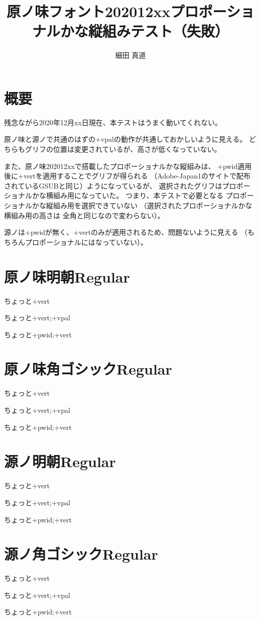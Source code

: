 \documentclass[tate]{jlreq}
\title{原ノ味フォント202012xxプロポーショナルかな縦組みテスト（失敗）}
\author{細田 真道}
\begin{document}
\maketitle

\section*{概要}

残念ながら2020年12月xx日現在、本テストはうまく動いてくれない。

原ノ味と源ノで共通のはずの+vpalの動作が共通しておかしいように見える。
どちらもグリフの位置は変更されているが、高さが低くなっていない。

また、原ノ味202012xxで搭載したプロポーショナルかな縦組みは、
+pwid適用後に+vertを適用することでグリフが得られる
（Adobe-Japan1のサイトで配布されているGSUBと同じ）ようになっているが、
選択されたグリフはプロポーショナルかな横組み用になっていた。
つまり、本テストで必要となる
プロポーショナルかな縦組み用を選択できていない
（選択されたプロポーショナルかな横組み用の高さは
  全角と同じなので変わらない）。

源ノは+pwidが無く、+vertのみが適用されるため、問題ないように見える
（もちろんプロポーショナルにはなっていない）。

\clearpage

\section*{原ノ味明朝Regular}

\hmrnone\hbox{\tate\vrule ちょっと\vrule +vert}

\hmrvpal\hbox{\tate\vrule ちょっと\vrule +vert;+vpal}

\hmrpwidvert\hbox{\tate\vrule ちょっと\vrule +pwid;+vert}

\section*{原ノ味角ゴシックRegular}

\hgrnone\hbox{\tate\vrule ちょっと\vrule +vert}

\hgrvpal\hbox{\tate\vrule ちょっと\vrule +vert;+vpal}

\hgrpwidvert\hbox{\tate\vrule ちょっと\vrule +pwid;+vert}

\section*{源ノ明朝Regular}

\sernone\hbox{\tate\vrule ちょっと\vrule +vert}

\servpal\hbox{\tate\vrule ちょっと\vrule +vert;+vpal}

\serpwidvert\hbox{\tate\vrule ちょっと\vrule +pwid;+vert}

\section*{源ノ角ゴシックRegular}

\sarnone\hbox{\tate\vrule ちょっと\vrule +vert}

\sarvpal\hbox{\tate\vrule ちょっと\vrule +vert;+vpal}

\sarpwidvert\hbox{\tate\vrule ちょっと\vrule +pwid;+vert}
\end{document}
